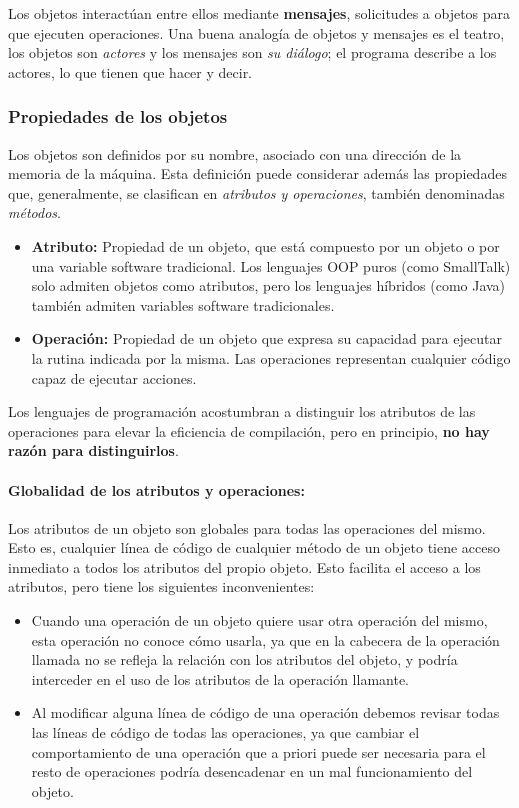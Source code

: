 \vspace{5mm}

Los objetos interactúan entre ellos mediante \textbf{mensajes},
solicitudes a objetos para que ejecuten operaciones.  Una buena
analogía de objetos y mensajes es el teatro, los objetos son
\emph{actores} y los mensajes son \emph{su diálogo}; el programa
describe a los actores, lo que tienen que hacer y decir.

\subsubsection{Propiedades de los objetos} Los objetos son definidos
por su nombre, asociado con una dirección de la memoria de la máquina.
Esta definición puede considerar además las propiedades que,
generalmente, se clasifican en \emph{atributos y operaciones}, también
denominadas \emph{métodos}.
\begin{itemize}
\item \textbf{Atributo:} Propiedad de un objeto, que está compuesto
  por un objeto o por una variable software tradicional. Los lenguajes
  OOP puros (como SmallTalk) solo admiten objetos como atributos, pero
  los lenguajes híbridos (como Java) también admiten variables software
  tradicionales.
\item \textbf{Operación: } Propiedad de un objeto que expresa su
  capacidad para ejecutar la rutina indicada por la misma. Las
  operaciones representan cualquier código capaz de ejecutar acciones.
\end{itemize}

\vspace{5mm}

Los lenguajes de programación acostumbran a distinguir los atributos
de las operaciones para elevar la eficiencia de compilación, pero en
principio, \textbf{no hay razón para distinguirlos}.

\vspace{5mm}

\paragraph{Globalidad de los atributos y operaciones:} Los atributos
de un objeto son globales para todas las operaciones del mismo. Esto
es, cualquier línea de código de cualquier método de un objeto tiene
acceso inmediato a todos los atributos del propio objeto. Esto
facilita el acceso a los atributos, pero tiene los siguientes
inconvenientes:
\begin{itemize}
\item Cuando una operación de un objeto quiere usar otra operación del
  mismo, esta operación no conoce cómo usarla, ya que en la cabecera de
  la operación llamada no se refleja la relación con los atributos del
  objeto, y podría interceder en el uso de los atributos de la operación
  llamante.
\item Al modificar alguna línea de código de una operación debemos
  revisar todas las líneas de código de todas las operaciones, ya que
  cambiar el comportamiento de una operación que a priori puede ser
  necesaria para el resto de operaciones podría desencadenar en un mal
  funcionamiento del objeto.
\end{itemize}

